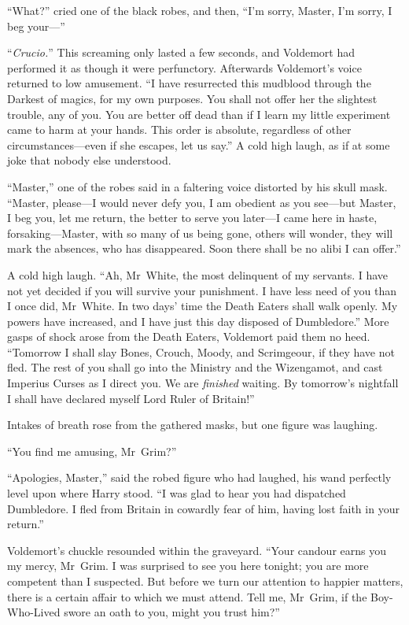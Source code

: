 “What?” cried one of the black robes, and then, “I’m sorry, Master, I’m sorry, I beg your—”

“\emph{Crucio.}” This screaming only lasted a few seconds, and Voldemort had performed it as though it were perfunctory. Afterwards Voldemort’s voice returned to low amusement. “I have resurrected this mudblood through the Darkest of magics, for my own purposes. You shall not offer her the slightest trouble, any of you. You are better off dead than if I learn my little experiment came to harm at your hands. This order is absolute, regardless of other circumstances—even if she escapes, let us say.” A cold high laugh, as if at some joke that nobody else understood.

“Master,” one of the robes said in a faltering voice distorted by his skull mask. “Master, please—I would never defy you, I am obedient as you see—but Master, I beg you, let me return, the better to serve you later—I came here in haste, forsaking—Master, with so many of us being gone, others will wonder, they will mark the absences, who has disappeared. Soon there shall be no alibi I can offer.”

A cold high laugh. “Ah, Mr~White, the most delinquent of my servants. I have not yet decided if you will survive your punishment. I have less need of you than I once did, Mr~White. In two days’ time the Death Eaters shall walk openly. My powers have increased, and I have just this day disposed of Dumbledore.” More gasps of shock arose from the Death Eaters, Voldemort paid them no heed. “Tomorrow I shall slay Bones, Crouch, Moody, and Scrimgeour, if they have not fled. The rest of you shall go into the Ministry and the Wizengamot, and cast Imperius Curses as I direct you. We are \emph{finished} waiting. By tomorrow’s nightfall I shall have declared myself Lord Ruler of Britain!”

Intakes of breath rose from the gathered masks, but one figure was laughing.

“You find me amusing, Mr~Grim?”

“Apologies, Master,” said the robed figure who had laughed, his wand perfectly level upon where Harry stood. “I was glad to hear you had dispatched Dumbledore. I fled from Britain in cowardly fear of him, having lost faith in your return.”

Voldemort’s chuckle resounded within the graveyard. “Your candour earns you my mercy, Mr~Grim. I was surprised to see you here tonight; you are more competent than I suspected. But before we turn our attention to happier matters, there is a certain affair to which we must attend. Tell me, Mr~Grim, if the Boy-Who-Lived swore an oath to you, might you trust him?”

